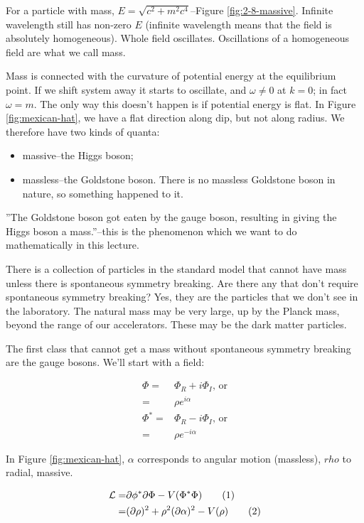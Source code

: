 \documentclass[]{article}
\newcommand\numberthis{\addtocounter{equation}{1}\tag{\theequation}}
\begin{document}
For a particle with mass, $E=\sqrt{c^2 + m^2 c^4}$--Figure \ref{fig:2-8-massive}. Infinite wavelength still has non-zero $E$ (infinite wavelength means that the field is absolutely homogeneous). Whole field oscillates. Oscillations of a homogeneous field are what we call mass.

Mass is connected with the curvature of potential energy at the equilibrium point. If we shift system away it starts to oscillate, and $\omega \ne 0$ at $k=0$; in fact $\omega = m$. The only way this doesn't happen is if potential energy is flat. In Figure \ref{fig:mexican-hat}, we have a flat direction along dip, but not along radius. We therefore have two kinds of quanta:
\begin{itemize}
	\item massive--the Higgs boson;
	\item massless--the Goldstone boson. There is no massless Goldstone boson in nature, so something happened to it.
\end{itemize}

''The Goldstone boson got eaten by the gauge boson, resulting in giving the Higgs boson a mass.''--this is the phenomenon which we want to do mathematically in this lecture.

There is a collection of particles in the standard model that cannot have mass unless there is spontaneous symmetry breaking. Are there any that don't require spontaneous symmetry breaking? Yes, they are the particles that we don't see in the laboratory. The natural mass may be very large, up by the Planck mass, beyond the range of our accelerators. These may be the dark matter particles.

The first class that cannot get a mass without spontaneous symmetry breaking are the gauge bosons. We'll start with a field:

\begin{align*}
	\Phi =& \Phi_R + i \Phi_I \text{, or}\\
	=& \rho e^{i \alpha}\\
	\Phi^* =& \Phi_R - i \Phi_I \text{, or}\\
	=& \rho e^{-i \alpha}
\end{align*}

In Figure \ref{fig:mexican-hat}, $\alpha$ corresponds to angular motion (massless), $rho$  to radial, massive.

\begin{align*}
	\mathcal{L} =& \partial \phi^* \partial \Phi - V(\Phi^*\Phi)  \numberthis \label{eq:mexican:LagrangeRI}\\
	=& (\partial \rho)^2 + \rho^2 (\partial \alpha)^2 - V(\rho) \numberthis \label{eq:mexican:Lagrange}
\end{align*} 
\end{document}
